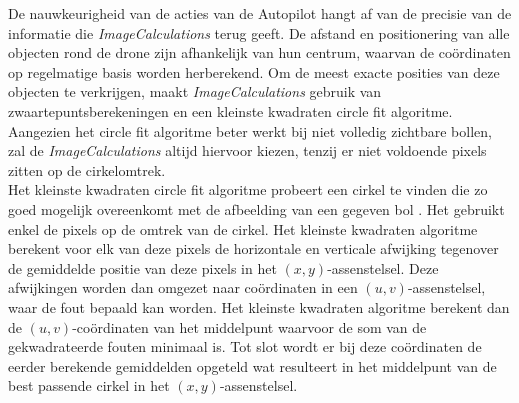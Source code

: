 \noindent
De nauwkeurigheid van de acties van de Autopilot hangt af van de precisie van de informatie die \textit{ImageCalculations} terug geeft. De afstand en positionering van alle objecten rond de drone zijn afhankelijk van hun centrum, waarvan de co\"ordinaten op regelmatige basis worden herberekend. Om de meest exacte posities van deze objecten te verkrijgen, maakt \textit{ImageCalculations} gebruik van zwaartepuntsberekeningen en een kleinste kwadraten circle fit algoritme. Aangezien het circle fit algoritme beter werkt bij niet volledig zichtbare bollen, zal de \textit{ImageCalculations} altijd hiervoor kiezen, tenzij er niet voldoende pixels zitten op de cirkelomtrek.
\\
Het kleinste kwadraten circle fit algoritme probeert een cirkel te vinden die zo goed mogelijk overeenkomt met de afbeelding van een gegeven bol \cite{website:kleinsteKwadraten}. Het gebruikt enkel de pixels op de omtrek van de cirkel. Het kleinste kwadraten algoritme berekent voor elk van deze pixels de horizontale en verticale afwijking tegenover de gemiddelde positie van deze pixels in het \((x,y)\)-assenstelsel. Deze afwijkingen worden dan omgezet naar co\"ordinaten in een \((u,v)\)-assenstelsel, waar de fout bepaald kan worden. Het kleinste kwadraten algoritme berekent dan de \((u,v)\)-co\"ordinaten van het middelpunt waarvoor de som van de gekwadrateerde fouten minimaal is. Tot slot wordt er bij deze co\"ordinaten de eerder berekende gemiddelden opgeteld wat resulteert in het middelpunt van de best passende cirkel in het \((x,y)\)-assenstelsel.

